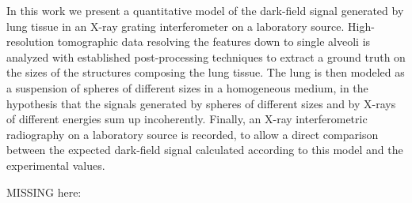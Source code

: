 In this work we present a quantitative model of the dark-field signal
generated by lung tissue in an X-ray grating interferometer on a laboratory
source. High-resolution tomographic data resolving the features down to single
alveoli is analyzed with established post-processing techniques to extract a
ground truth on the sizes of the structures composing the lung tissue. The
lung is then modeled as a suspension of spheres of different sizes in a
homogeneous medium, in the hypothesis that the signals generated by spheres
of different sizes and by X-rays of different energies sum up incoherently.
Finally, an X-ray interferometric radiography on a laboratory source is
recorded, to allow a direct comparison between the expected dark-field
signal calculated according to this model and the experimental values.

MISSING here: 
